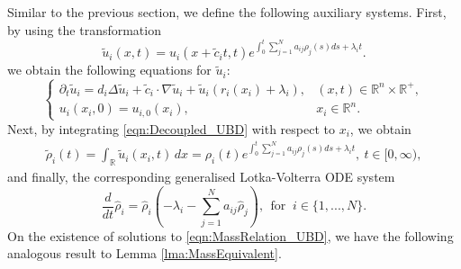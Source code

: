 \documentclass{article}
\newcommand{\md}[1]{{\color{red}Hong:  #1}}
\begin{document}
 Similar to the previous section, we define the following auxiliary systems. First, by using the transformation
\begin{equation}\label{eqn:DecouplingEqn_UBD}
    \tilde{u}_i(x,t)=u_i(x+\tilde{c}_it,t)e^{\int_{0}^ t\sum_{j=1}^Na_{ij}\rho_j(s)ds+\lambda_it}.
\end{equation}
we obtain the following equations for $\tilde{u}_i$:
\begin{equation}\label{eqn:Decoupled_UBD}
\begin{cases}
\partial_{t}\tilde{u}_i=d_i\Delta{}{\tilde{u}}_i+\tilde{c}_i\cdot\nabla\tilde{u}_i+\tilde{u}_i\left(r_i(x_i)+\lambda_i\right),&(x,t)\in\mathbb{R}^n\times\mathbb{R}^{+},
    \\
    u_i(x_i,0)=u_{i,0}(x_i),&x_i\in\mathbb{R}^n.
      \end{cases}
  \end{equation}
Next, by integrating \eqref{eqn:Decoupled_UBD} with respect to $x_i$, we obtain
\begin{align}\label{eqn:MassRelation_UBD}
\tilde{\rho}_i(t)=\int_{\mathbb{R}} \tilde{u}_i(x_i,t)\,dx=\rho_i(t)e^{\int_{0}^t\sum_{j=1}^Na_{ij}\rho_j(s)ds+\lambda_it},~t\in[0,\infty),
\end{align}
and finally, the corresponding generalised Lotka-Volterra ODE system
\begin{equation}\label{eqn:GLV_UBD}
    \frac{d}{dt}\hat{\rho}_i^ {}=\hat{\rho}_{i}^{}\left(-\lambda_i-\sum_{j=1}^{N}a_{ij}\hat{\rho}_j^{}\right),~~\text{for }~i\in\{1,...,N\}.
\end{equation}
On the existence of solutions to \eqref{eqn:MassRelation_UBD}, we have the following analogous result to Lemma \ref{lma:MassEquivalent}. 
\end{document}
